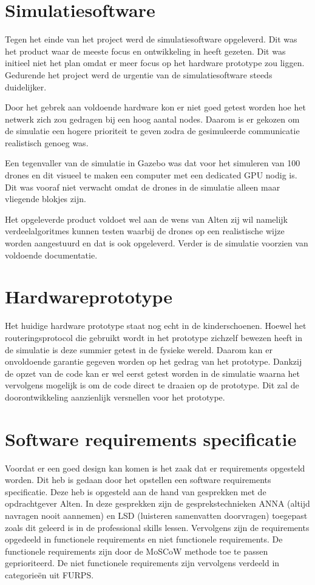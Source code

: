 \documentclass[a4paper, 11pt, oneside]{report}
\begin{document}
\section{Simulatiesoftware}\label{sec:simulatiesoftware}
Tegen het einde van het project werd de simulatiesoftware opgeleverd. 
Dit was het product waar de meeste focus en ontwikkeling in heeft gezeten.
Dit was initieel niet het plan omdat er meer focus op het hardware prototype zou liggen.
Gedurende het project werd de urgentie van de simulatiesoftware steeds duidelijker.

Door het gebrek aan voldoende hardware kon er niet goed getest worden hoe het netwerk zich zou gedragen bij een hoog aantal nodes.
Daarom is er gekozen om de simulatie een hogere prioriteit te geven zodra de gesimuleerde communicatie realistisch genoeg was.

Een tegenvaller van de simulatie in Gazebo was dat voor het simuleren van 100 drones en dit visueel te maken een computer met een dedicated GPU nodig is. Dit was vooraf niet verwacht omdat de drones in de simulatie alleen maar vliegende blokjes zijn. 

Het opgeleverde product voldoet wel aan de wens van Alten zij wil namelijk verdeelalgoritmes kunnen testen waarbij de drones op een realistische wijze worden aangestuurd en dat is ook opgeleverd.  Verder is de simulatie voorzien van voldoende documentatie.  

\section{Hardwareprototype}\label{sec:hardwareprototype}
Het huidige hardware prototype staat nog echt in de kinderschoenen.
Hoewel het routeringsprotocol die gebruikt wordt in het prototype zichzelf bewezen heeft in de simulatie is deze summier getest in de fysieke wereld.
Daarom kan er onvoldoende garantie gegeven worden op het gedrag van het prototype.
Dankzij de opzet van de code kan er wel eerst getest worden in de simulatie waarna het vervolgens mogelijk is om de code direct te draaien op de prototype.
Dit zal de doorontwikkeling aanzienlijk versnellen voor het prototype.


\section{Software requirements specificatie}\label{sec:software-requirements-specificatie}
Voordat er een goed design kan komen is het zaak dat er requirements opgesteld worden.
Dit heb is gedaan door het opstellen een software requirements specificatie.  
Deze heb is opgesteld aan de hand van gesprekken met de opdrachtgever Alten.
In deze gesprekken zijn de gesprekstechnieken ANNA (altijd navragen nooit aannemen) en LSD (luisteren samenvatten doorvragen) toegepast zoals dit geleerd is in de professional skills lessen.  
Vervolgens zijn de requirements opgedeeld in functionele requirements en niet functionele requirements. 
De functionele requirements zijn door de MoSCoW methode toe te passen geprioriteerd.
De niet functionele requirements zijn vervolgens verdeeld in categorieën uit FURPS. 
\end{document}
